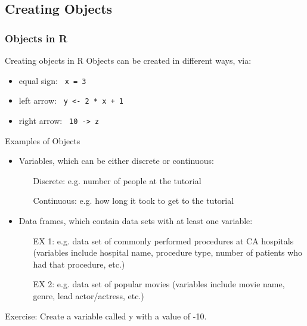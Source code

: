 \subsection{Creating Objects}
\begin{frame}[allowframebreaks]
	\frametitle{Objects in R}
		\begin{block}{Creating objects in R}
Objects can be created in different ways, via:
			\begin{itemize}
				\item equal sign: \lstinline$ x = 3 $
				\item left arrow: \lstinline$ y <- 2 * x + 1 $
				\item right arrow: \lstinline$ 10 -> z $
			\end{itemize}
		\end{block}

\newpage
	\begin{block}{Examples of Objects}
		\begin{itemize}
			\item[]
			\item Variables, which can be either discrete or continuous:
				\begin{itemize} 
					\item[Discrete:] e.g. number of people at the tutorial
					\item[Continuous:] e.g. how long it took to get to the tutorial
				\end{itemize}
			\item[]
			\item Data frames, which contain data sets with at least one variable:
				\begin{itemize} 
					\item[EX 1:] e.g. data set of commonly performed procedures at CA hospitals (variables include hospital name, procedure type, number of patients who had that procedure, etc.)
					\item[EX 2:] e.g. data set of popular movies (variables include movie name, genre, lead actor/actress, etc.)
				\end{itemize}
		\end{itemize}
	\end{block}

\newpage
	\begin{alertblock}{Exercise:}
		Create a variable called y with a value of -10.
	\end{alertblock}

\end{frame}


